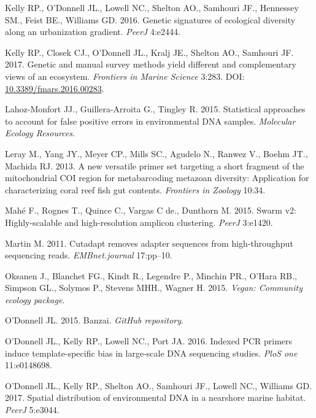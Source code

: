 \documentclass[fleqn,10pt,lineno]{wlpeerj} %
\begin{document}
\hypertarget{ref-kelly2016genetic}{}
Kelly RP., O'Donnell JL., Lowell NC., Shelton AO., Samhouri JF.,
Hennessey SM., Feist BE., Williams GD. 2016. Genetic signatures of
ecological diversity along an urbanization gradient. \emph{PeerJ}
4:e2444.

\hypertarget{ref-kelly2017multilocus}{}
Kelly RP., Closek CJ., O'Donnell JL., Kralj JE., Shelton AO., Samhouri
JF. 2017. Genetic and manual survey methods yield different and
complementary views of an ecosystem. \emph{Frontiers in Marine Science}
3:283. DOI:
\href{https://doi.org/10.3389/fmars.2016.00283}{10.3389/fmars.2016.00283}.

\hypertarget{ref-lahoz2015statistical}{}
Lahoz-Monfort JJ., Guillera-Arroita G., Tingley R. 2015. Statistical
approaches to account for false positive errors in environmental DNA
samples. \emph{Molecular Ecology Resources}.

\hypertarget{ref-leray_new_2013}{}
Leray M., Yang JY., Meyer CP., Mills SC., Agudelo N., Ranwez V., Boehm
JT., Machida RJ. 2013. A new versatile primer set targeting a short
fragment of the mitochondrial COI region for metabarcoding metazoan
diversity: Application for characterizing coral reef fish gut contents.
\emph{Frontiers in Zoology} 10:34.

\hypertarget{ref-mahe2015swarm}{}
Mahé F., Rognes T., Quince C., Vargas C de., Dunthorn M. 2015. Swarm v2:
Highly-scalable and high-resolution amplicon clustering. \emph{PeerJ}
3:e1420.

\hypertarget{ref-martin2011cutadapt}{}
Martin M. 2011. Cutadapt removes adapter sequences from high-throughput
sequencing reads. \emph{EMBnet.journal} 17:pp--10.

\hypertarget{ref-vegan}{}
Oksanen J., Blanchet FG., Kindt R., Legendre P., Minchin PR., O'Hara
RB., Simpson GL., Solymos P., Stevens MHH., Wagner H. 2015. \emph{Vegan:
Community ecology package}.

\hypertarget{ref-banzai}{}
O'Donnell JL. 2015. Banzai. \emph{GitHub repository}.

\hypertarget{ref-o2016indexed}{}
O'Donnell JL., Kelly RP., Lowell NC., Port JA. 2016. Indexed PCR primers
induce template-specific bias in large-scale DNA sequencing studies.
\emph{PloS one} 11:e0148698.

\hypertarget{ref-o2017spatial}{}
O'Donnell JL., Kelly RP., Shelton AO., Samhouri JF., Lowell NC.,
Williams GD. 2017. Spatial distribution of environmental DNA in a
nearshore marine habitat. \emph{PeerJ} 5:e3044.
\end{document}
